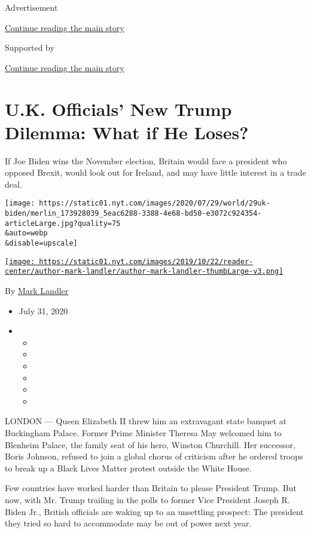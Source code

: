 Advertisement

\protect\hyperlink{after-top}{Continue reading the main story}

Supported by

\protect\hyperlink{after-sponsor}{Continue reading the main story}

\hypertarget{uk-officials-new-trump-dilemma-what-if-he-loses}{%
\section{U.K. Officials' New Trump Dilemma: What if He
Loses?}\label{uk-officials-new-trump-dilemma-what-if-he-loses}}

If Joe Biden wins the November election, Britain would face a president
who opposed Brexit, would look out for Ireland, and may have little
interest in a trade deal.

\texttt{[image: https://static01.nyt.com/images/2020/07/29/world/29uk-biden/merlin\_173928039\_5eac6288-3388-4e68-bd50-e3072c924354-articleLarge.jpg?quality=75\\\&auto=webp\\\&disable=upscale]}

\href{https://www.nytimes.com/by/mark-landler}{\texttt{[image: https://static01.nyt.com/images/2019/10/22/reader-center/author-mark-landler/author-mark-landler-thumbLarge-v3.png]}}

By \href{https://www.nytimes.com/by/mark-landler}{Mark Landler}

\begin{itemize}
\item
  July 31, 2020
\item
  \begin{itemize}
  \item
  \item
  \item
  \item
  \item
  \item
  \end{itemize}
\end{itemize}

LONDON --- Queen Elizabeth II threw him an extravagant state banquet at
Buckingham Palace. Former Prime Minister Theresa May welcomed him to
Blenheim Palace, the family seat of his hero, Winston Churchill. Her
successor, Boris Johnson, refused to join a global chorus of criticism
after he ordered troops to break up a Black Lives Matter protest outside
the White House.

Few countries have worked harder than Britain to please President Trump.
But now, with Mr. Trump trailing in the polls to former Vice President
Joseph R. Biden Jr., British officials are waking up to an unsettling
prospect: The president they tried so hard to accommodate may be out of
power next year.


